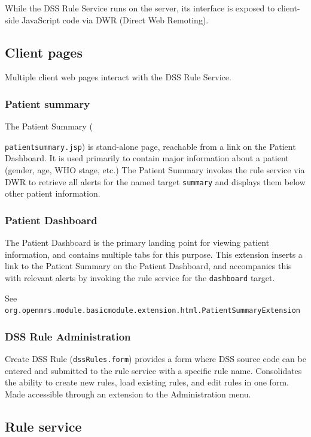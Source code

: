 \documentclass[12pt,letterpaper]{article}
\begin{document}
While the DSS Rule Service runs on the server, its interface is exposed to client-side JavaScript code via DWR (Direct Web Remoting).

\subsection{Client pages} \label{sec:CLIENT_PAGES}

Multiple client web pages interact with the DSS Rule Service.

\subsubsection{Patient summary} \label{sec:PATIENT_SUMMARY}

The Patient Summary ({\texttt{patientsummary.jsp}) is  stand-alone page, reachable from a link on the Patient Dashboard. It is used primarily to contain major information about a patient (gender, age, WHO stage, etc.) The Patient Summary invokes the rule service via DWR to retrieve all alerts for the named target  \texttt{summary} and displays them below other patient information. 

\subsubsection{Patient Dashboard} \label{sec:PATIENT_DASHBOARD}

The Patient Dashboard is the primary landing point for viewing patient information, and contains multiple tabs for this purpose. This extension inserts a link to the Patient Summary on the Patient Dashboard, and accompanies this with relevant alerts by invoking the rule service for the \texttt{dashboard} target.

See \texttt{org.openmrs.module.basicmodule.extension.html.PatientSummaryExtension}

\subsubsection {DSS Rule Administration} 
\label{sec:DSS_RULE_ADMINISTRATION}

Create DSS Rule (\texttt{dssRules.form}) provides a form where DSS source code can be entered and submitted to the rule service with a specific rule name. Consolidates the ability to create new rules, load existing rules, and edit rules in one form. Made accessible through an extension to the Administration menu.

\subsection{Rule service} \label{sec:RULE_SERVICE}

}
\end{document}
